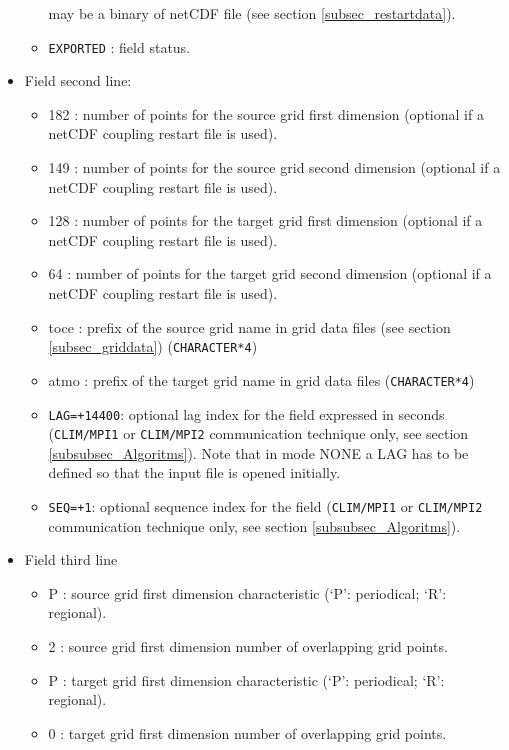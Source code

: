 \begin{itemize}
\begin{itemize}
	  may be a binary of netCDF file (see section
	  \ref{subsec_restartdata}).
        \item {\tt EXPORTED} : field status.
        \end{itemize}
      \item Field second line:
        \begin{itemize}
        \item 182 : number of points for the source grid first
        dimension (optional if a netCDF coupling restart file is used). 
        \item 149 : number of points for the source grid second
        dimension (optional if a netCDF coupling restart file is used).    
        \item 128 : number of points for the target grid first
        dimension (optional if a netCDF coupling restart file is used). 
        \item 64 : number of points for the target grid second
        dimension (optional if a netCDF coupling restart file is used).  
        \item toce : prefix of the source grid name in grid data files (see section
        \ref{subsec_griddata}) ({\tt CHARACTER*4})
        \item atmo : prefix of the target grid name in grid data files
        ({\tt CHARACTER*4})
        \item {\tt LAG=+14400}: optional lag index for the field
        expressed in seconds ({\tt CLIM/MPI1} or {\tt CLIM/MPI2}
        communication technique only, see section
        \ref{subsubsec_Algoritms}). Note that in mode NONE a LAG has
        to be defined so that the input file is opened initially.
        \item {\tt SEQ=+1}: optional sequence index for the field
        ({\tt CLIM/MPI1} or {\tt CLIM/MPI2} communication technique
        only, see section \ref{subsubsec_Algoritms}).
        \end{itemize}
      \item Field third line
        \begin{itemize}
         \item P : source grid first dimension characteristic
            (`P': periodical; `R': regional).
         \item 2 : source grid first dimension number of overlapping grid points.
         \item P : target grid first dimension characteristic (`P':
         periodical; `R': regional).
         \item 0 : target grid first dimension number of overlapping grid points.
        \end{itemize}
     
      \end{itemize}
    
